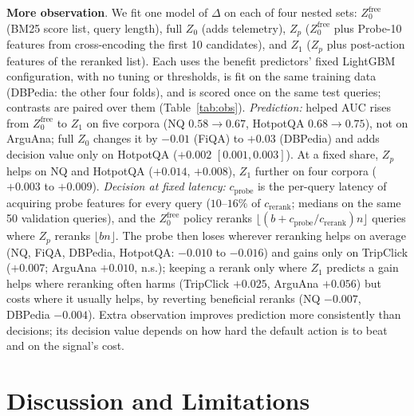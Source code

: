 \documentclass[sigconf,anonymous,review]{acmart}
\begin{document}
\textbf{More observation}\label{sec:probe}. We fit one model of
$\Delta$ on each of four nested sets: $Z_0^{\text{free}}$ (BM25 score
list, query length), full $Z_0$ (adds telemetry), $Z_p$
($Z_0^{\text{free}}$ plus Probe-10 features from cross-encoding the
first 10 candidates), and $Z_1$ ($Z_p$ plus post-action features of
the reranked list). Each uses the benefit predictors' fixed LightGBM
configuration, with no tuning or thresholds, is fit on the same
training data (DBPedia: the other four folds), and is scored once on
the same test queries; contrasts are paired over them
(Table~\ref{tab:obs}). \emph{Prediction:} helped AUC rises from
$Z_0^{\text{free}}$ to $Z_1$ on five corpora (NQ $0.58\to0.67$,
HotpotQA $0.68\to0.75$), not on ArguAna; full $Z_0$ changes it by
$-0.01$ (FiQA) to $+0.03$ (DBPedia) and adds decision value only on
HotpotQA ($+0.002$ $[0.001,0.003]$). At a fixed share, $Z_p$ helps on NQ and HotpotQA ($+0.014$,
$+0.008$), $Z_1$ further on four corpora ($+0.003$ to $+0.009$).
\emph{Decision at fixed latency:} $c_{\text{probe}}$ is the per-query
latency of acquiring probe features for every query ($10$--$16\%$ of
$c_{\text{rerank}}$; medians on the same 50 validation queries), and
the $Z_0^{\text{free}}$ policy reranks $\lfloor(b+c_{\text{probe}}/c_{\text{rerank}})n\rfloor$
queries where $Z_p$ reranks $\lfloor bn\rfloor$. The probe then loses
wherever reranking helps on average (NQ, FiQA, DBPedia, HotpotQA:
$-0.010$ to $-0.016$) and gains only on TripClick ($+0.007$; ArguAna
$+0.010$, n.s.); keeping a rerank only where $Z_1$ predicts a gain
helps where reranking often harms (TripClick $+0.025$, ArguAna
$+0.056$) but costs where it usually helps, by reverting beneficial
reranks (NQ $-0.007$, DBPedia $-0.004$). Extra observation improves prediction more
consistently than decisions; its decision value depends on how hard
the default action is to beat and on the signal's cost.

\section{Discussion and Limitations}
\label{sec:discussion}
\end{document}
